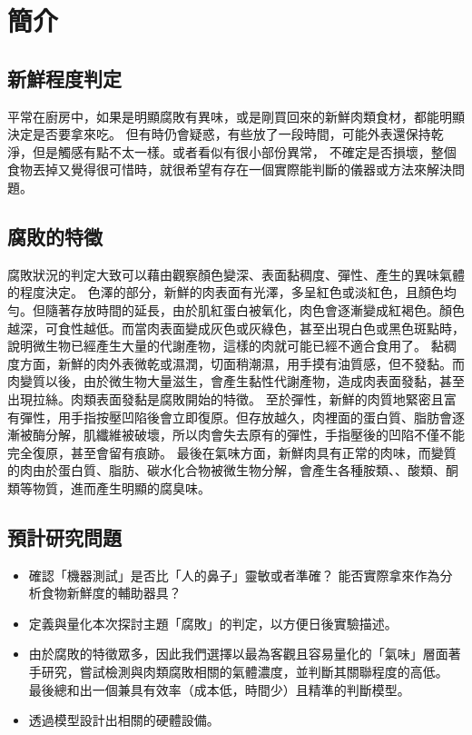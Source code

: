 \chapter{簡介}

\section{新鮮程度判定}
平常在廚房中，如果是明顯腐敗有異味，或是剛買回來的新鮮肉類食材，都能明顯決定是否要拿來吃。
但有時仍會疑惑，有些放了一段時間，可能外表還保持乾淨，但是觸感有點不太一樣。或者看似有很小部份異常，
不確定是否損壞，整個食物丟掉又覺得很可惜時，就很希望有存在一個實際能判斷的儀器或方法來解決問題。

\section{腐敗的特徵}
腐敗狀況的判定大致可以藉由觀察顏色變深、表面黏稠度、彈性、產生的異味氣體的程度決定。
色澤的部分，新鮮的肉表面有光澤，多呈紅色或淡紅色，且顏色均勻。但隨著存放時間的延長，由於肌紅蛋白被氧化，肉色會逐漸變成紅褐色。顏色越深，可食性越低。而當肉表面變成灰色或灰綠色，甚至出現白色或黑色斑點時，說明微生物已經產生大量的代謝產物，這樣的肉就可能已經不適合食用了。
黏稠度方面，新鮮的肉外表微乾或濕潤，切面稍潮濕，用手摸有油質感，但不發黏。而肉變質以後，由於微生物大量滋生，會產生黏性代謝產物，造成肉表面發黏，甚至出現拉絲。肉類表面發黏是腐敗開始的特徵。
至於彈性，新鮮的肉質地緊密且富有彈性，用手指按壓凹陷後會立即復原。但存放越久，肉裡面的蛋白質、脂肪會逐漸被酶分解，肌纖維被破壞，所以肉會失去原有的彈性，手指壓後的凹陷不僅不能完全復原，甚至會留有痕跡。
最後在氣味方面，新鮮肉具有正常的肉味，而變質的肉由於蛋白質、脂肪、碳水化合物被微生物分解，會產生各種胺類、、酸類、酮類等物質，進而產生明顯的腐臭味。

\section{預計研究問題}
\begin{itemize}
	\item 確認「機器測試」是否比「人的鼻子」靈敏或者準確？
		能否實際拿來作為分析食物新鮮度的輔助器具？
	\item 定義與量化本次探討主題「腐敗」的判定，以方便日後實驗描述。
	\item 由於腐敗的特徵眾多，因此我們選擇以最為客觀且容易量化的「氣味」層面著手研究，嘗試檢測與肉類腐敗相關的氣體濃度，並判斷其關聯程度的高低。
		最後總和出一個兼具有效率（成本低，時間少）且精準的判斷模型。
	\item 透過模型設計出相關的硬體設備。
\end{itemize}